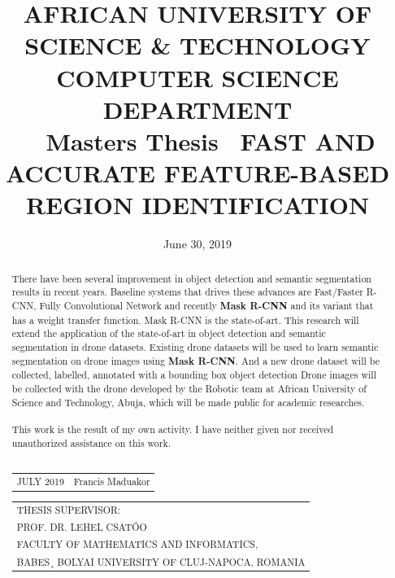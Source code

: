 \documentclass{article}
\title{
\large AFRICAN UNIVERSITY OF SCIENCE \& TECHNOLOGY \\COMPUTER SCIENCE DEPARTMENT\\
\
\
Masters Thesis
\
\large FAST AND ACCURATE FEATURE-BASED REGION IDENTIFICATION
}
\date{June 30, 2019}
\begin{document}
 
\begin{titlepage}
\maketitle
\begin{abstract}
\noindent There have been several improvement in object detection and semantic segmentation results in recent years. Baseline systems that drives these advances are Fast/Faster R-CNN, Fully Convolutional Network and recently \textbf{Mask R-CNN} and its variant that has a weight transfer function.  Mask R-CNN is the state-of-art.  This research will extend the application of the state-of-art in object detection and semantic segmentation in drone datasets. Existing drone datasets will be used to learn semantic segmentation on drone images using \textbf{Mask R-CNN}. And a new drone dataset will be collected, labelled, annotated with a bounding box object detection Drone images will be collected with the drone developed by the Robotic team at African University of Science and Technology, Abuja, which will be made public for academic researches.
\\
\\
This work is the result of my own activity. I have neither given nor received unauthorized assistance on this work.
\\
\\

\noindent
\begin{tabular}{lr}
JULY 2019
&
Francis Maduakor
\end{tabular}

\noindent
\begin{tabular}{l}
THESIS SUPERVISOR:\\
PROF. DR. LEHEL CSATÓO \\
FACULTY OF MATHEMATICS AND INFORMATICS, \\
BABES¸ BOLYAI UNIVERSITY OF CLUJ-NAPOCA, ROMANIA 
\end{tabular}








\end{abstract}
\end{titlepage}
\end{document}
